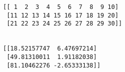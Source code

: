 \documentclass[11pt]{article}
\begin{document}
    \begin{Verbatim}[commandchars=\\\{\}]
[[ 1  2  3  4  5  6  7  8  9 10]
 [11 12 13 14 15 16 17 18 19 20]
 [21 22 23 24 25 26 27 28 29 30]]


[[18.52157747  6.47697214]
 [49.81310011  1.91182038]
 [81.10462276 -2.65333138]]
    \end{Verbatim}


    
    
    
\end{document}
